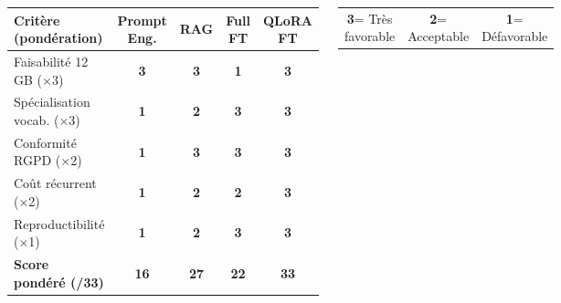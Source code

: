 \documentclass[a0paper, portrait, 25pt]{tikzposter}
\begin{document}
\begin{columns}
{    %
    \begin{center}
    \renewcommand{\arraystretch}{1.5}
    \large
    \begin{tabular}{@{} p{8cm} c c c c @{}}
        \toprule
        \textbf{Critère (pondération)}
            & \textbf{Prompt Eng.}
            & \textbf{RAG}
            & \textbf{Full FT}
            & \textbf{QLoRA FT} \\
        \midrule
        Faisabilité 12\,GB ($\times$3)
            & \cellcolor{resultGreen!25}\textbf{3}
            & \cellcolor{resultGreen!25}\textbf{3}
            & \cellcolor{resultRed!25}\textbf{1}
            & \cellcolor{resultGreen!25}\textbf{3} \\
        Spécialisation vocab. ($\times$3)
            & \cellcolor{resultRed!25}\textbf{1}
            & \cellcolor{resultOrange!25}\textbf{2}
            & \cellcolor{resultGreen!25}\textbf{3}
            & \cellcolor{resultGreen!25}\textbf{3} \\
        Conformité RGPD ($\times$2)
            & \cellcolor{resultRed!25}\textbf{1}
            & \cellcolor{resultGreen!25}\textbf{3}
            & \cellcolor{resultGreen!25}\textbf{3}
            & \cellcolor{resultGreen!25}\textbf{3} \\
        Coût récurrent ($\times$2)
            & \cellcolor{resultRed!25}\textbf{1}
            & \cellcolor{resultOrange!25}\textbf{2}
            & \cellcolor{resultOrange!25}\textbf{2}
            & \cellcolor{resultGreen!25}\textbf{3} \\
        Reproductibilité ($\times$1)
            & \cellcolor{resultRed!25}\textbf{1}
            & \cellcolor{resultOrange!25}\textbf{2}
            & \cellcolor{resultGreen!25}\textbf{3}
            & \cellcolor{resultGreen!25}\textbf{3} \\
        \midrule
        \textbf{Score pondéré (/33)}
            & \textbf{16}
            & \textbf{27}
            & \cellcolor{resultRed!15}\textbf{22}
            & \cellcolor{resultGreen!30}\textbf{33} \\
        \bottomrule
    \end{tabular}
    \end{center}

    \vspace{4pt}
    \begin{center}
    \small
    \begin{tabular}{@{}ccc@{}}
        \cellcolor{resultGreen!25}\quad\textbf{3}\quad = Très favorable \qquad &
        \cellcolor{resultOrange!25}\quad\textbf{2}\quad = Acceptable \qquad &
        \cellcolor{resultRed!25}\quad\textbf{1}\quad = Défavorable
    \end{tabular}
    \end{center}

}
\end{columns}
\end{document}
